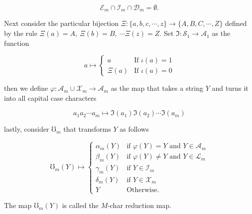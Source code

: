 \documentclass[amsmath,12pt,a4paper]{amsart}
\begin{document}
 
 \begin{equation}\label{Eq12} 
 \mathcal{E}_m \cap \mathcal{I}_m\cap\mathcal{D}_m = \emptyset.
 \end{equation}
 
 
 
Next consider the particular bijection $\Xi: \{a,b,c,\cdots,z\}\rightarrow \{A,B,C,\cdots,Z\} $ defined by the rule $\Xi(a) = A,~\Xi(b) = B,~ \cdots \Xi(z) = Z $. Set $\Im: \mathcal{S}_1\rightarrow \mathcal{A}_1$ as the function 


\begin{equation}\label{Eq13}
a \mapsto \begin{cases}
a & \text{If $\iota(a) =1$}\\
\Xi(a)& \text{If $\iota(a)=0$}
\end{cases}
\end{equation}

then we define $\varphi:\mathcal{A}_m \cup \mathcal{X}_m \rightarrow \mathcal{A}_m$ as the map that takes a string $Y$ and turns it into all capital case characters

\begin{equation}\label{Eq14}
a_1a_2\cdots a_m\mapsto \Im(a_1)\Im(a_2)\cdots \Im(a_m)
\end{equation}

 lastly, consider $\mho_m$ that transforms $Y$ as follows
 
 
\begin{equation}\label{Eq15}
\mho_m(Y)\mapsto \begin{cases}
\alpha_m(Y) & \text{if $\varphi(Y) = Y$ and $Y \in \mathcal{A}_m$} \\
\beta_m(Y) & \text{if $\varphi(Y) \neq Y$ and $Y \in \mathcal{L}_m$} \\
\gamma_m(Y) & \text{if $Y \in \mathcal{I}_m$} \\
\delta_m(Y) & \text{if $Y \in \mathcal{X}_m$}\\
Y & \text{Otherwise}.
\end{cases}
\end{equation} 
 
The map $\mho_m(Y)$ is called the $M$-char reduction map.
\end{document}
